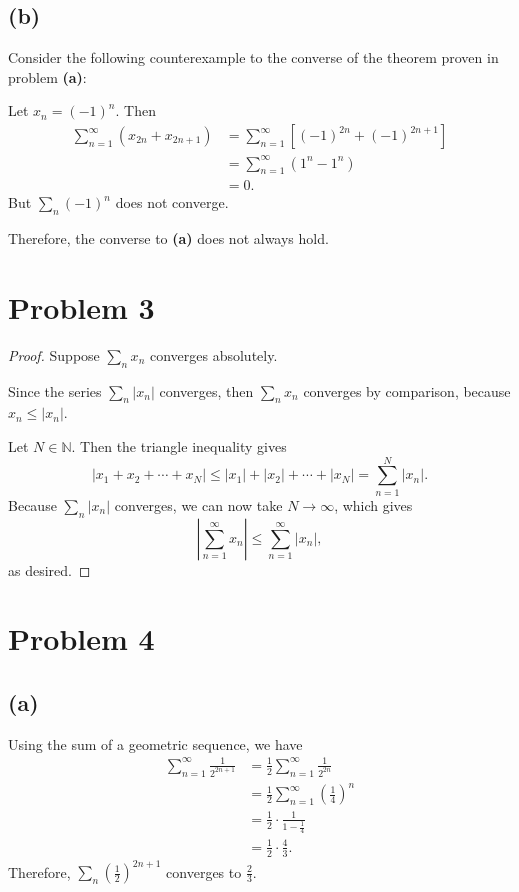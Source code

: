 \documentclass{article}
\begin{document}
\subsection*{(b)}
Consider the following counterexample to the converse of the theorem proven in problem \textbf{(a)}:

Let $x_n = (-1)^n$. Then 
\begin{align}
	\sum_{n=1}^{\infty}\left(x_{2n} +x_{2n+1}\right) &= \sum_{n=1}^{\infty}\left[(-1)^{2n} + (-1)^{2n+1}\right] \\
	&= \sum_{n=1}^{\infty}\left(1^n - 1^n \right) \\
	&= 0.
\end{align}
But $\sum_n (-1)^n$ does not converge. 

Therefore, the converse to \textbf{(a)} does not always hold.
\section*{Problem 3}
\begin{proof}
	Suppose $\sum_n x_n$ converges absolutely.
	
	Since the series $\sum_n |x_n|$ converges, then $\sum_n x_n$ converges by comparison, because $x_n \leq |x_n|$.
	
	Let $N \in \mathbb{N}$. Then the triangle inequality gives
	\begin{equation}
		|x_1 + x_2 + \cdots + x_N| \leq |x_1| + |x_2| + \cdots + |x_N| = \sum_{n=1}^{N}|x_n|.
	\end{equation}
	Because $\sum_n |x_n|$ converges, we can now take $N \to \infty$, which gives
	\begin{equation}
		\left|\sum_{n=1}^{\infty} x_n \right| \leq \sum_{n=1}^{\infty} |x_n|,
	\end{equation}
	as desired.
\end{proof}
\section*{Problem 4}
\subsection*{(a)}
Using the sum of a geometric sequence, we have
\begin{align}
	\sum_{n=1}^{\infty} \frac{1}{2^{2n+1}} &= \frac{1}{2}\sum_{n=1}^{\infty}\frac{1}{2^{2n}} \\
	&= \frac{1}{2} \sum_{n=1}^{\infty}\left(\frac{1}{4}\right)^n \\
	&= \frac{1}{2} \cdot \frac{1}{1-\frac{1}{4}} \\
	&= \frac{1}{2} \cdot \frac{4}{3}.
\end{align}
Therefore, $\sum_n \left(\frac{1}{2}\right)^{2n+1}$ converges to $\frac{2}{3}$.
\end{document}
